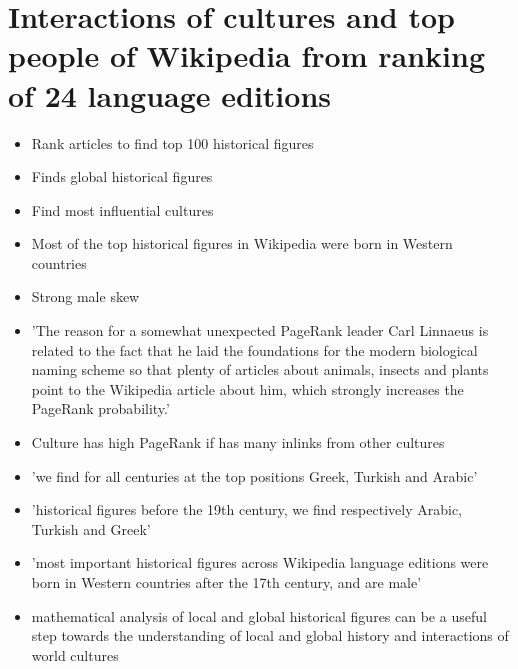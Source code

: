 \documentclass[11pt]{report}
\begin{document}
\section{Interactions of cultures and top people of Wikipedia from ranking of 24 language editions}
\begin{itemize}
\item Rank articles to find top 100 historical figures
\item Finds global historical figures
\item Find most influential cultures
\item Most of the top historical figures in Wikipedia were born in Western countries
\item Strong male skew
\item 'The reason for a somewhat unexpected PageRank leader Carl Linnaeus is related to the fact that he laid the foundations for the modern biological naming scheme so that plenty of articles about animals, insects and plants point to the Wikipedia article about him, which strongly increases the PageRank probability.'
\item Culture has high PageRank if has many inlinks from other cultures
\item  'we find for all centuries at the top positions Greek, Turkish and Arabic'
\item 'historical figures before
the 19th century, we find respectively Arabic, Turkish and Greek'
\item 'most important historical figures across Wikipedia language editions were born in Western countries after the 17th century, and are male'
\item mathematical analysis of local and global historical figures can be a useful
step towards the understanding of local and global history and interactions of world cultures
\end{itemize}
\end{document}
